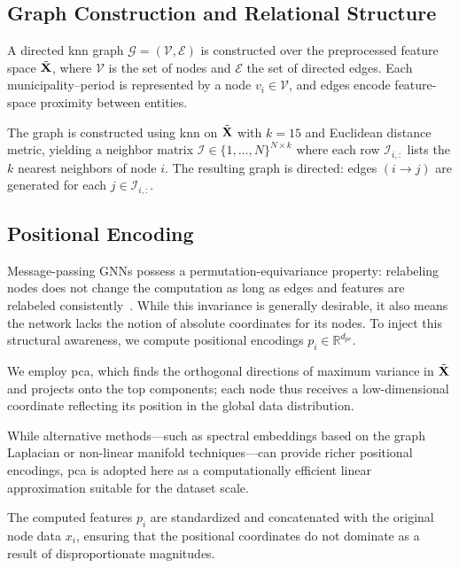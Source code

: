 \documentclass[english]{sbrt}
\begin{document}
\subsection{Graph Construction and Relational Structure} \label{sec:graph}

A directed \gls{knn} graph $\mathcal{G} = (\mathcal{V}, \mathcal{E})$ is
constructed over the preprocessed feature space $\tilde{\mathbf{X}}$, where $\mathcal{V}$
is the set of nodes and $\mathcal{E}$ the set of directed edges. Each
municipality--period is represented by a node $v_i \in \mathcal{V}$, and edges
encode feature-space proximity between entities.

The graph is constructed using \gls{knn} on $\tilde{\mathbf{X}}$ with $k=15$ and Euclidean distance
metric, yielding a neighbor matrix $\mathcal{I} \in \{1,\ldots,N\}^{N \times k}$
where each row $\mathcal{I}_{i,:}$ lists the $k$ nearest neighbors of node $i$.
The resulting graph is directed: edges $(i \rightarrow j)$ are generated for
each $j \in \mathcal{I}_{i,:}$.

\subsection{Positional Encoding} \label{sec:pe}

Message-passing GNNs possess a permutation-equivariance property: relabeling
nodes does not change the computation as long as edges and features are
relabeled consistently~\cite{dai2025survey}. While this invariance is generally
desirable, it also means the network lacks the notion of absolute coordinates
for its nodes. To inject this structural awareness, we compute positional
encodings $p_i \in \mathbb{R}^{d_{pe}}$.

We employ \gls{pca}, which finds the orthogonal directions of maximum variance
in $\tilde{\mathbf{X}}$ and projects onto the top components; each node thus receives a
low-dimensional coordinate reflecting its position in the global data
distribution.

While alternative methods---such as spectral embeddings based on the graph
Laplacian or non-linear manifold techniques---can provide richer positional
encodings, \gls{pca} is adopted here as a computationally efficient linear
approximation suitable for the dataset scale.

The computed features $p_i$ are standardized and concatenated with the original
node data $x_i$, ensuring that the positional coordinates do not dominate as a
result of disproportionate magnitudes.
\end{document}
